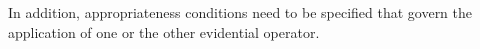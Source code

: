 \documentclass[output=paper]{langscibook}
\begin{document}
In addition, appropriateness conditions need to be specified that govern the application of one or the other evidential operator.



\end{document}
